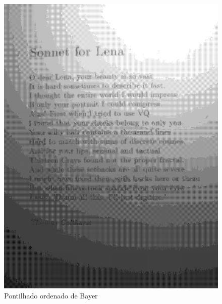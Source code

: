 \documentclass{article}
\begin{document}
\begin{figure}[!htb]
    \begin{minipage}{0.48\textwidth}
      \centering
      \includegraphics[width=.99\linewidth]{results/image_2_soneto.png}
      \caption{Pontilhado ordenado de Bayer}\label{Fig:soneto3}
    \end{minipage}\hfill
    \begin{minipage}{0.48\textwidth}
      \centering

\end{minipage}
\end{figure}
\end{document}
